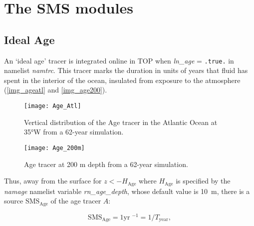 \documentclass[../main/TOP_manual]{subfiles}
\begin{document}

\section{The SMS modules}

\label{SMS_models}

\subsection{Ideal Age}

An `ideal age' tracer is integrated online in TOP when \textit{ln\_age} = \texttt{.true.} in namelist \textit{namtrc}.
This tracer marks the duration in units of years that fluid has spent in the interior of the ocean, insulated from exposure to the atmosphere  (\autoref{img_ageatl} and \autoref{img_age200}).

\begin{figure}[!h]
	\centering
	\texttt{[image: Age\_Atl]}
	\caption{Vertical distribution of the Age tracer in the Atlantic Ocean at 35°W from a 62-year simulation.}
	\label{img_ageatl}
\end{figure}

\begin{figure}[!h]
	\centering
	\texttt{[image: Age\_200m]}
	\caption{Age tracer at 200 m depth from a 62-year simulation.}
	\label{img_age200}
\end{figure}

Thus, away from the surface for $z<-H_{\mathrm{Age}}$ where $H_{\mathrm{Age}}$ is specified by the \textit{namage} namelist variable \textit{rn\_age\_depth}, whose default value is 10~m, there is a source $\mathrm{SMS_{\mathrm{Age}}}$ of the age tracer $A$:

\begin{equation}
  \label{eq:TOP-age-interior}
  \mathrm{SMS_{\mathrm{Age}}} = 1 \mathrm{yr}\;^{-1} = 1/T_{\mathrm{year}},
\end{equation}
\end{document}
